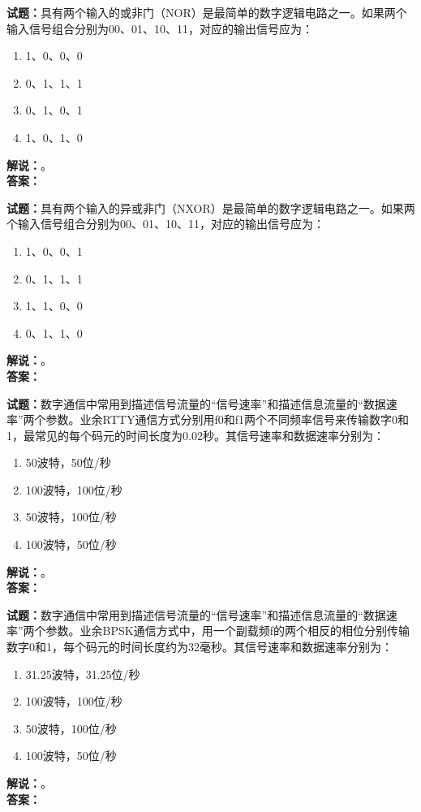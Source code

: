 \documentclass{ctexbook}
\begin{document}
\vspace{\baselineskip}

\noindent\textbf{试题：}具有两个输入的或非门（NOR）是最简单的数字逻辑电路之一。如果两个输入信号组合分别为00、01、10、11，对应的输出信号应为：
\begin{enumerate}[leftmargin=3em]
  \item 1、0、0、0
  \item 0、1、1、1
  \item 0、1、0、1
  \item 1、0、1、0
\end{enumerate}
\noindent\textbf{解说：}\textbf{}。\\\noindent\textbf{答案：}

\vspace{\baselineskip}

\noindent\textbf{试题：}具有两个输入的异或非门（NXOR）是最简单的数字逻辑电路之一。如果两个输入信号组合分别为00、01、10、11，对应的输出信号应为：
\begin{enumerate}[leftmargin=3em]
  \item 1、0、0、1
  \item 0、1、1、1
  \item 1、1、0、0
  \item 0、1、1、0
\end{enumerate}
\noindent\textbf{解说：}\textbf{}。\\\noindent\textbf{答案：}

\vspace{\baselineskip}

\noindent\textbf{试题：}数字通信中常用到描述信号流量的“信号速率”和描述信息流量的“数据速率”两个参数。业余RTTY通信方式分别用f0和f1两个不同频率信号来传输数字0和1，最常见的每个码元的时间长度为0.02秒。其信号速率和数据速率分别为：
\begin{enumerate}[leftmargin=3em]
  \item 50波特，50位/秒
  \item 100波特，100位/秒
  \item 50波特，100位/秒
  \item 100波特，50位/秒
\end{enumerate}
\noindent\textbf{解说：}\textbf{}。\\\noindent\textbf{答案：}

\vspace{\baselineskip}

\noindent\textbf{试题：}数字通信中常用到描述信号流量的“信号速率”和描述信息流量的“数据速率”两个参数。业余BPSK通信方式中，用一个副载频f的两个相反的相位分别传输数字0和1，每个码元的时间长度约为32毫秒。其信号速率和数据速率分别为：
\begin{enumerate}[leftmargin=3em]
  \item 31.25波特，31.25位/秒
  \item 100波特，100位/秒
  \item 50波特，100位/秒
  \item 100波特，50位/秒
\end{enumerate}
\noindent\textbf{解说：}\textbf{}。\\\noindent\textbf{答案：}
\end{document}
